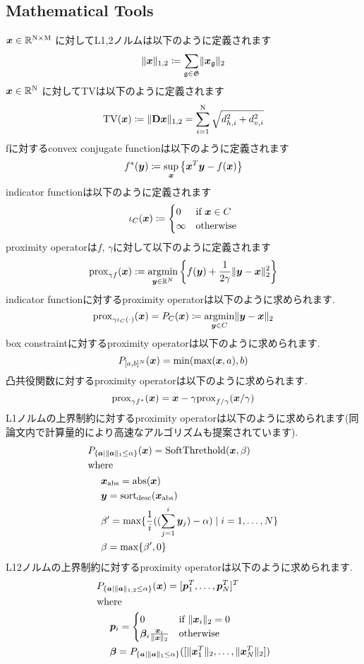 \subsection{Mathematical Tools}\label{subsec:mathematical-tools}
$\vecx \in \realNumber^{\intN \times \intM}$ に対してL1,2ノルムは以下のように定義されます
\begin{equation} \label{eq:L12NormDefinitionEq} \LOneTwoNormDefinition \end{equation}
$\vecx \in \realNumber^{\intN}$ に対してTV\cite{TV}は以下のように定義されます
\begin{equation} \label{eq:TVDefinitionEq} \TotalVariationDefinition \end{equation}
fに対するconvex conjugate functionは以下のように定義されます
\begin{equation} \label{eq:ConjugateFunctionDefinitionEq} \conjugateFunctionDefinition \end{equation}
indicator functionは以下のように定義されます
\begin{equation} \label{eq:IndicatorFunctionDefinitionEq} \indicatorFunctionDefinition \end{equation}
proximity operatorは$f$, $\gamma$に対して以下のように定義されます
\begin{equation} \label{eq:ProximityOperatorDefinitionEq} \proximityOperatorDefinition \end{equation}
indicator functionに対するproximity operatorは以下のように求められます.
\begin{equation} \label{eq:ProximityOperatorDefinitionWithIndicatorFunctionEq}
\proximityOperator{ \gamma \indicatorFunction{C}{\cdot} }{\vecx} = P_C(\vecx) \coloneq \argmin{\vecy \in C} \LTwoNorm{\vecy - \vecx}
\end{equation}
box constraintに対するproximity operatorは以下のように求められます.
\begin{equation} \label{eq:ProximityOperatorForBoxConstraint} \projBoxSolution \end{equation}
凸共役関数に対するproximity operatorは以下のように求められます.
\begin{equation} \label{eq:ProximityOperatorDefinitionWithConvexConjugateFunctionEq} \proximityOperatorDefinitionWithConvexConjugateFunction \end{equation}
L1ノルムの上界制約に対するproximity operatorは以下のように求められます\cite{L1-ball-projection}(同論文内で計算量的により高速なアルゴリズムも提案されています).
\begin{equation} \label{eq:ProximityOperatorForL1Ball}  \projLOneBallSolution \end{equation}
L12ノルムの上界制約に対するproximity operatorは以下のように求められます\cite{L12-ball-projection}.
\begin{equation} \label{eq:ProximityOperatorForL12Ball} \projLOneTwoBallSolution \end{equation}

